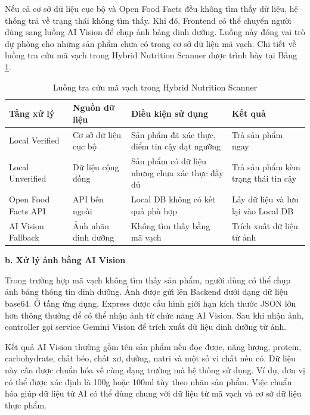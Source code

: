 \documentclass[12pt, a4paper]{report}
\begin{document}
Nếu cả cơ sở dữ liệu cục bộ và Open Food Facts đều không tìm thấy dữ liệu, hệ thống trả về trạng thái không tìm thấy. Khi đó, Frontend có thể chuyển người dùng sang luồng AI Vision để chụp ảnh bảng dinh dưỡng. Luồng này đóng vai trò dự phòng cho những sản phẩm chưa có trong cơ sở dữ liệu mã vạch. Chi tiết về luồng tra cứu mã vạch trong Hybrid Nutrition Scanner được trình bày tại Bảng \ref{tab:luong_tra_cuu_barcode}.

\begin{table}[htbp]
\centering
\caption{Luồng tra cứu mã vạch trong Hybrid Nutrition Scanner}
\label{tab:luong_tra_cuu_barcode}
\begin{tabular}{|>{\raggedright\arraybackslash}p{3cm}|>{\raggedright\arraybackslash}p{3cm}|>{\raggedright\arraybackslash}p{4cm}|>{\raggedright\arraybackslash}p{5cm}|}
\hline
\textbf{Tầng xử lý} & \textbf{Nguồn dữ liệu} & \textbf{Điều kiện sử dụng} & \textbf{Kết quả} \\
\hline
Local Verified & Cơ sở dữ liệu cục bộ & Sản phẩm đã xác thực, điểm tin cậy đạt ngưỡng & Trả sản phẩm ngay \\
\hline
Local Unverified & Dữ liệu cộng đồng & Sản phẩm có dữ liệu nhưng chưa xác thực đầy đủ & Trả sản phẩm kèm trạng thái tin cậy \\
\hline
Open Food Facts API & API bên ngoài & Local DB không có kết quả phù hợp & Lấy dữ liệu và lưu lại vào Local DB \\
\hline
AI Vision Fallback & Ảnh nhãn dinh dưỡng & Không tìm thấy bằng mã vạch & Trích xuất dữ liệu từ ảnh \\
\hline
\end{tabular}
\end{table}

\textbf{b. Xử lý ảnh bằng AI Vision}

Trong trường hợp mã vạch không tìm thấy sản phẩm, người dùng có thể chụp ảnh bảng thông tin dinh dưỡng. Ảnh được gửi lên Backend dưới dạng dữ liệu base64. Ở tầng ứng dụng, Express được cấu hình giới hạn kích thước JSON lớn hơn thông thường để có thể nhận ảnh từ chức năng AI Vision. Sau khi nhận ảnh, controller gọi service Gemini Vision để trích xuất dữ liệu dinh dưỡng từ ảnh.

Kết quả AI Vision thường gồm tên sản phẩm nếu đọc được, năng lượng, protein, carbohydrate, chất béo, chất xơ, đường, natri và một số vi chất nếu có. Dữ liệu này cần được chuẩn hóa về cùng dạng trường mà hệ thống sử dụng. Ví dụ, đơn vị có thể được xác định là 100g hoặc 100ml tùy theo nhãn sản phẩm. Việc chuẩn hóa giúp dữ liệu từ AI có thể dùng chung với dữ liệu từ mã vạch và cơ sở dữ liệu thực phẩm.
\end{document}
